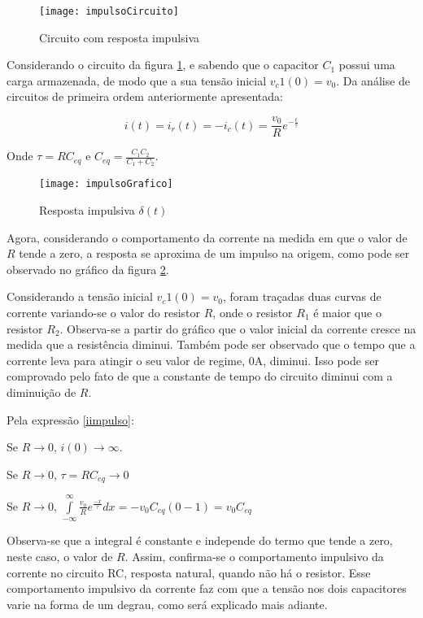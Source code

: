 \documentclass[12pt,fleqn]{book} %
\begin{document}
        \begin{figure}[!htbp] \centering\texttt{[image: impulsoCircuito]}
            \caption{Circuito com resposta impulsiva}\label{impulsoCircuito} 
        \end{figure}

Considerando o circuito da figura \ref{impulsoCircuito}, e sabendo que o capacitor $C_1$ possui uma carga armazenada, de modo que a sua tensão inicial $v_c1 (0)=v_0$. Da análise de circuitos de primeira ordem anteriormente apresentada:

\begin{equation}\label{iimpulso}
i(t)=i_r (t)=-i_c(t)=\frac{v_0}{R} e^{-\frac{t}{\tau}}
\end{equation}

Onde $\tau = RC_{eq}$ e $C_{eq} = \frac{C_1C_2}{C_1+C_2}$.

\begin{figure}[!htbp] \centering\texttt{[image: impulsoGrafico]}
            \caption{Resposta impulsiva $\delta(t)$}\label{impulsoGrafico} 
        \end{figure}

Agora, considerando o comportamento da corrente na medida em que o valor de $R$ tende a zero, a resposta se aproxima de um impulso na origem, como pode ser observado no gráfico da figura \ref{impulsoGrafico}.

Considerando a tensão inicial $v_c1 (0)=v_0$, foram traçadas duas curvas de corrente variando-se o valor do resistor $R$, onde o resistor $R_1$ é maior que o resistor $R_2$. Observa-se a partir do gráfico que o valor inicial da corrente cresce na medida que a resistência diminui. Também pode ser observado que o tempo que a corrente leva para atingir o seu valor de regime, 0A, diminui. Isso pode ser comprovado pelo fato de que a constante de tempo do circuito diminui com a diminuição de $R$.

Pela expressão \ref{iimpulso}:
 
Se $R\rightarrow0$, $i(0)\rightarrow\infty$.

Se $R\rightarrow0$, $\tau = RC_{eq}\rightarrow0$

Se $R\rightarrow0$, $\int\limits_{-\infty}^{\infty}\frac{v_0}{R}e^{\frac{-x}{\tau}}dx=-v_0 C_{eq} (0-1)=v_0 C_{eq}$ 

Observa-se que a integral é constante e independe do termo que tende a zero, neste caso, o valor de $R$. Assim, confirma-se o comportamento impulsivo da corrente no circuito RC, resposta natural, quando não há o resistor. Esse comportamento impulsivo da corrente faz com que a tensão nos dois capacitores varie na forma de um degrau, como será explicado mais adiante.
\end{document}
